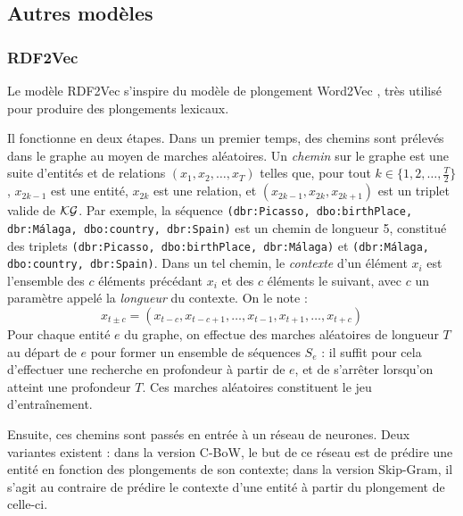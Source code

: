 \FloatBarrier

\subsection{Autres modèles}
\label{subsec:kge-models-misc}

\subsubsection{RDF2Vec \cite{ristoski2016rdf2vec}}

Le modèle RDF2Vec s'inspire du modèle de plongement Word2Vec \cite{mikolov2013distributed}, très utilisé pour produire des plongements lexicaux.

Il fonctionne en deux étapes. 
Dans un premier temps, des chemins sont prélevés dans le graphe au moyen de marches aléatoires.
Un \textit{chemin} sur le graphe est une suite d'entités et de relations $(x_1, x_2, \ldots, x_T)$ telles que, pour tout $k \in \{1, 2, \ldots, \frac{T}{2}\}$, $x_{2k-1}$ est une entité, $x_{2k}$ est une relation, et $(x_{2k-1}, x_{2k}, x_{2k+1})$ est un triplet valide de $\mathcal{KG}$. Par exemple, la séquence \texttt{(dbr:Picasso, dbo:birthPlace, dbr:Málaga, dbo:country, dbr:Spain)} est un chemin de longueur 5, constitué des triplets \texttt{(dbr:Picasso, dbo:birthPlace, dbr:Málaga)} et \texttt{(dbr:Málaga, \allowbreak dbo:country, dbr:Spain)}. 
Dans un tel chemin, le \textit{contexte} d'un élément $x_i$ est l'ensemble des $c$ éléments précédant $x_i$ et des $c$ éléments le suivant, avec $c$ un paramètre appelé la \textit{longueur}
du contexte. On le note :
 \begin{equation}
    x_{t \pm c} = (x_{t-c}, x_{t-c+1}, \ldots, x_{t-1}, x_{t+1}, \ldots, x_{t+c})
\end{equation}
 Pour chaque entité $e$ du graphe, on effectue des marches aléatoires de longueur $T$ au départ de $e$ pour former un ensemble de séquences $S_e$ : il suffit pour cela d'effectuer une recherche en profondeur à partir de $e$, et de s'arrêter lorsqu'on atteint une profondeur $T$. Ces marches aléatoires constituent le jeu d'entraînement.


Ensuite, ces chemins sont passés en entrée à un réseau de neurones. Deux variantes existent : dans la version C-BoW, le but de ce réseau est de prédire une entité en fonction des plongements de son contexte; dans la version Skip-Gram, il s'agit au contraire de prédire le contexte d'une entité à partir du plongement de celle-ci.

